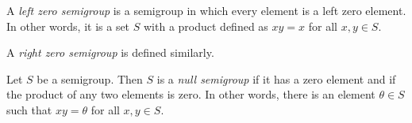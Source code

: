 \documentclass[12pt]{article}
\begin{document}
A \emph{left zero semigroup} is a semigroup in which every element is a left zero element.  In other words, it is a set $S$ with a product defined as $xy = x$ for all $x, y \in S$.

A \emph{right zero semigroup} is defined similarly.

Let $S$ be a semigroup.  Then $S$ is a \emph{null semigroup} if it has a zero element and if the product of any two elements is zero.  In other words, there is an element $\theta \in S$ such that $xy = \theta$ for all $x, y \in S$.
\end{document}
